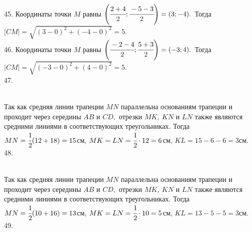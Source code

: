 \documentclass[12pt]{article}
\begin{document}
45. Координаты точки $M$ равны $\left(\cfrac{2+4}{2};\cfrac{-5-3}{2}\right)=(3;-4).$ Тогда $|CM|=\sqrt{(3-0)^2+(-4-0)^2}=5.$\\
46. Координаты точки $M$ равны $\left(\cfrac{-2-4}{2};\cfrac{5+3}{2}\right)=(-3;4).$ Тогда $|CM|=\sqrt{(-3-0)^2+(4-0)^2}=5.$\\
47. \begin{figure}[ht!]
\end{figure}\\
Так как средняя линии трапеции $MN$ параллельна основаниям трапеции и проходит через середины $AB$ и $CD,$ отрезки $MK,\ KN$ и $LN$ также являются средними линиями в соответствующих треугольниках. Тогда $MN=\cfrac{1}{2}(12+18)=15$см, $MK=LN=\cfrac{1}{2}\cdot12=6$см, $KL=15-6-6=3$см.\\
48. \begin{figure}[ht!]
\end{figure}\\
Так как средняя линии трапеции $MN$ параллельна основаниям трапеции и проходит через середины $AB$ и $CD,$ отрезки $MK,\ KN$ и $LN$ также являются средними линиями в соответствующих треугольниках. Тогда $MN=\cfrac{1}{2}(10+16)=13$см, $MK=LN=\cfrac{1}{2}\cdot10=5$см, $KL=13-5-5=3$см.\\
49. \begin{figure}[ht!]
\end{figure}\\
\end{document}
